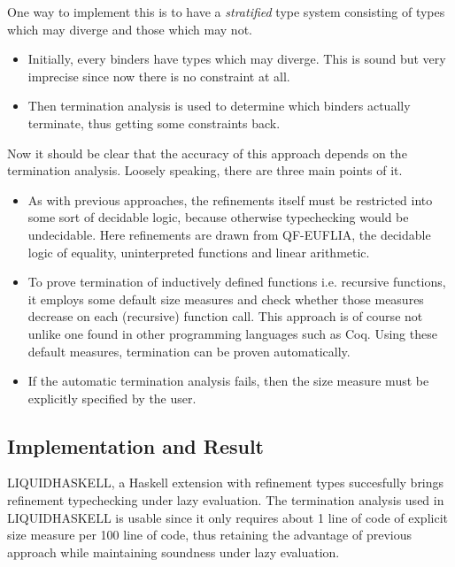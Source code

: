\documentclass[a4paper,UKenglish]{lipics-v2016}
\begin{document}
      One way to implement this is to have a \emph{stratified} type system
      consisting of types which may diverge and those which may not.
      \begin{itemize}
        \item Initially, every binders have types which may diverge.  This is
          sound but very imprecise since now there is no constraint at all.
        \item Then termination analysis is used to determine which binders
          actually terminate, thus getting some constraints back.
      \end{itemize}

      Now it should be clear that the accuracy of this approach depends on the
      termination analysis.  Loosely speaking, there are three main points of
      it.
      \begin{itemize}
        \item As with previous approaches, the refinements itself must be
          restricted into some sort of decidable logic, because otherwise
          typechecking would be undecidable.  Here refinements are drawn from
          QF-EUFLIA, the decidable logic of equality, uninterpreted
          functions and linear arithmetic.
        \item To prove termination of inductively defined functions i.e.
          recursive functions, it employs some default size measures and check
          whether those measures decrease on each (recursive) function call.
          This approach is of course not unlike one found in other programming
          languages such as Coq. Using these default measures, termination can
          be proven automatically.
        \item If the automatic termination analysis fails, then the size
          measure must be explicitly specified by the user.
      \end{itemize}

    \subsection{Implementation and Result}
      
      LIQUIDHASKELL, a Haskell extension with refinement types succesfully
      brings refinement typechecking under lazy evaluation.  The termination
      analysis used in LIQUIDHASKELL is usable since it only requires about 1
      line of code of explicit size measure per 100 line of code, thus
      retaining the advantage of previous approach while maintaining soundness
      under lazy evaluation.
\end{document}
